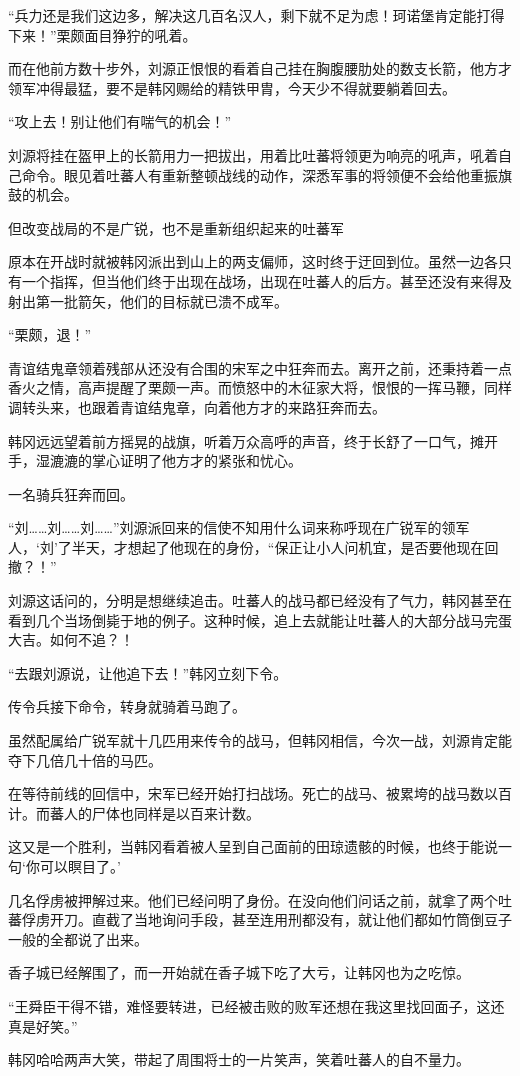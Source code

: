 “兵力还是我们这边多，解决这几百名汉人，剩下就不足为虑！珂诺堡肯定能打得下来！”栗颇面目狰狞的吼着。

而在他前方数十步外，刘源正恨恨的看着自己挂在胸腹腰肋处的数支长箭，他方才领军冲得最猛，要不是韩冈赐给的精铁甲胄，今天少不得就要躺着回去。

“攻上去！别让他们有喘气的机会！”

刘源将挂在盔甲上的长箭用力一把拔出，用着比吐蕃将领更为响亮的吼声，吼着自己命令。眼见着吐蕃人有重新整顿战线的动作，深悉军事的将领便不会给他重振旗鼓的机会。

但改变战局的不是广锐，也不是重新组织起来的吐蕃军

原本在开战时就被韩冈派出到山上的两支偏师，这时终于迂回到位。虽然一边各只有一个指挥，但当他们终于出现在战场，出现在吐蕃人的后方。甚至还没有来得及射出第一批箭矢，他们的目标就已溃不成军。

“栗颇，退！”

青谊结鬼章领着残部从还没有合围的宋军之中狂奔而去。离开之前，还秉持着一点香火之情，高声提醒了栗颇一声。而愤怒中的木征家大将，恨恨的一挥马鞭，同样调转头来，也跟着青谊结鬼章，向着他方才的来路狂奔而去。

韩冈远远望着前方摇晃的战旗，听着万众高呼的声音，终于长舒了一口气，摊开手，湿漉漉的掌心证明了他方才的紧张和忧心。

一名骑兵狂奔而回。

“刘……刘……刘……”刘源派回来的信使不知用什么词来称呼现在广锐军的领军人，‘刘’了半天，才想起了他现在的身份，“保正让小人问机宜，是否要他现在回撤？！”

刘源这话问的，分明是想继续追击。吐蕃人的战马都已经没有了气力，韩冈甚至在看到几个当场倒毙于地的例子。这种时候，追上去就能让吐蕃人的大部分战马完蛋大吉。如何不追？！

“去跟刘源说，让他追下去！”韩冈立刻下令。

传令兵接下命令，转身就骑着马跑了。

虽然配属给广锐军就十几匹用来传令的战马，但韩冈相信，今次一战，刘源肯定能夺下几倍几十倍的马匹。

在等待前线的回信中，宋军已经开始打扫战场。死亡的战马、被累垮的战马数以百计。而蕃人的尸体也同样是以百来计数。

这又是一个胜利，当韩冈看着被人呈到自己面前的田琼遗骸的时候，也终于能说一句‘你可以瞑目了。’

几名俘虏被押解过来。他们已经问明了身份。在没向他们问话之前，就拿了两个吐蕃俘虏开刀。直截了当地询问手段，甚至连用刑都没有，就让他们都如竹筒倒豆子一般的全都说了出来。

香子城已经解围了，而一开始就在香子城下吃了大亏，让韩冈也为之吃惊。

“王舜臣干得不错，难怪要转进，已经被击败的败军还想在我这里找回面子，这还真是好笑。”

韩冈哈哈两声大笑，带起了周围将士的一片笑声，笑着吐蕃人的自不量力。

